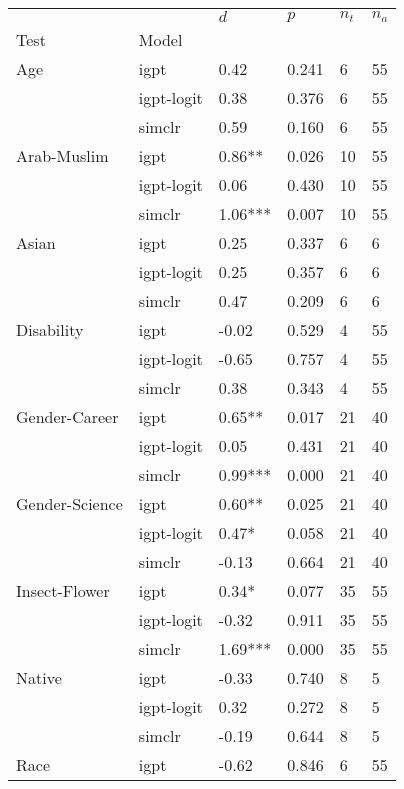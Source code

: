 \begin{tabular}{llllll}
\toprule
       &        &      $d$ &    $p$ & $n_t$ & $n_a$ \\
Test & Model &          &        &       &       \\
\midrule
Age & igpt &     0.42 &  0.241 &     6 &    55 \\
       & igpt-logit &     0.38 &  0.376 &     6 &    55 \\
       & simclr &     0.59 &  0.160 &     6 &    55 \\
Arab-Muslim & igpt &   0.86** &  0.026 &    10 &    55 \\
       & igpt-logit &     0.06 &  0.430 &    10 &    55 \\
       & simclr &  1.06*** &  0.007 &    10 &    55 \\
Asian & igpt &     0.25 &  0.337 &     6 &     6 \\
       & igpt-logit &     0.25 &  0.357 &     6 &     6 \\
       & simclr &     0.47 &  0.209 &     6 &     6 \\
Disability & igpt &    -0.02 &  0.529 &     4 &    55 \\
       & igpt-logit &    -0.65 &  0.757 &     4 &    55 \\
       & simclr &     0.38 &  0.343 &     4 &    55 \\
Gender-Career & igpt &   0.65** &  0.017 &    21 &    40 \\
       & igpt-logit &     0.05 &  0.431 &    21 &    40 \\
       & simclr &  0.99*** &  0.000 &    21 &    40 \\
Gender-Science & igpt &   0.60** &  0.025 &    21 &    40 \\
       & igpt-logit &    0.47* &  0.058 &    21 &    40 \\
       & simclr &    -0.13 &  0.664 &    21 &    40 \\
Insect-Flower & igpt &    0.34* &  0.077 &    35 &    55 \\
       & igpt-logit &    -0.32 &  0.911 &    35 &    55 \\
       & simclr &  1.69*** &  0.000 &    35 &    55 \\
Native & igpt &    -0.33 &  0.740 &     8 &     5 \\
       & igpt-logit &     0.32 &  0.272 &     8 &     5 \\
       & simclr &    -0.19 &  0.644 &     8 &     5 \\
Race & igpt &    -0.62 &  0.846 &     6 &    55 \\

\end{tabular}
